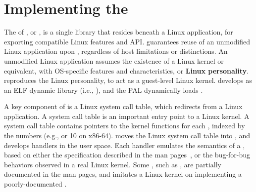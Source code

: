 \section{Implementing the \libos{}}


The \libos{} of \graphene{}, or 
\thelibos{},
is a single library that resides beneath a Linux application,
for exporting compatible Linux features and API.
\thelibos{} guarantees reuse of an unmodified Linux application
upon \thehostabi{},
regardless of host limitations or distinctions.
An unmodified Linux application assumes the existence of a Linux kernel or equivalent,
with OS-specific features and characteristics,
or {\bf Linux personality}.
\thelibos{} reproduces the Linux personality,
to act as a guest-level Linux kernel.
\graphene{} develops \thelibos{} as an ELF dynamic library (i.e., ),
and the PAL dynamically loads \thelibos{}.


A key component of \thelibos{}
is a Linux system call table, which redirects \linuxapis{} from a Linux application.
A system call table is an important entry point to a Linux kernel.
A system call table contains
pointers to the kernel functions for each \linuxapi{},
indexed by the \linuxapi{} numbers (e.g.,  or 10 on x86-64).
\graphene{} moves the Linux system call table into \thelibos{},
and develops \linuxapi{} handlers in the user space.
Each \linuxapi{} handler emulates
the semantics of a \linuxapi{},
based on either the specification %
described in the man pages~\cite{linux-man-syscall},
or the bug-for-bug behaviors
observed in a real Linux kernel.
Some \linuxapis{}, such as , are partially documented
in the man pages, and \thelibos{} imitates a Linux kernel on implementing a poorly-documented \linuxapis{}.

